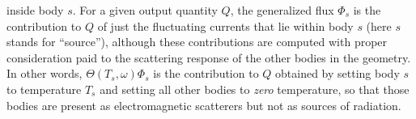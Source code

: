\documentclass[letterpaper]{article}
\begin{document}
inside body $s$. For a given output quantity 
$Q$, the generalized flux $\Phi_s$ is the contribution to $Q$ 
of just the fluctuating currents that lie within body $s$
(here $s$ stands for ``source''), although these contributions
are computed with proper consideration paid to the scattering
response of the other bodies in the geometry. In other words,
$\Theta(T_s,\omega)\Phi_s$ is the contribution to $Q$ 
obtained by setting body $s$ to temperature $T_s$ and setting
all other bodies to \textit{zero} temperature, so that those
bodies are present as electromagnetic scatterers but not as 
sources of radiation.
%
%
%
\end{document}
